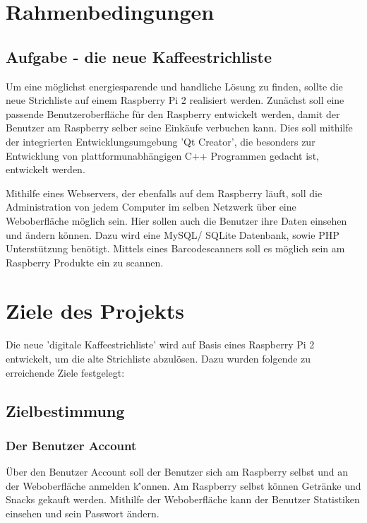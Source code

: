 \documentclass[11pt,a4paper]{article} %
\begin{document}
\section{Rahmenbedingungen}


\subsection{Aufgabe - die neue Kaffeestrichliste}
\label{SchriftAnpassen}

Um eine m\"oglichst energiesparende und handliche L\"osung zu finden, sollte die neue Strichliste auf einem Raspberry Pi 2 realisiert werden. Zun\"achst soll eine passende Benutzeroberfl\"ache f\"ur den Raspberry entwickelt werden, damit der Benutzer am Raspberry selber seine Eink\"aufe verbuchen kann. Dies soll mithilfe der integrierten Entwicklungsumgebung 'Qt Creator', die besonders zur Entwicklung von plattformunabh\"angigen C++ Programmen gedacht ist, entwickelt werden.
\par
Mithilfe eines Webservers, der ebenfalls auf dem Raspberry l\"auft, soll die Administration von jedem Computer im selben Netzwerk \"uber eine Weboberfl\"ache m\"oglich sein. Hier sollen auch die Benutzer ihre Daten einsehen und \"andern k\"onnen. Dazu wird eine MySQL/ SQLite Datenbank, sowie PHP Unterst\"utzung ben\"otigt. Mittels eines Barcodescanners soll es m\"oglich sein am Raspberry Produkte ein zu scannen.


\section{Ziele des Projekts}
Die neue 'digitale Kaffeestrichliste' wird auf Basis eines Raspberry Pi 2 entwickelt, um die alte Strichliste abzul\"osen. Dazu wurden folgende zu erreichende Ziele festgelegt:
\subsection{Zielbestimmung}
\label{Ausrichtung}

\subsubsection{Der Benutzer Account}
\"Uber den Benutzer Account soll der Benutzer sich am Raspberry selbst und an der Weboberfl\"ache anmelden k\''onnen. Am Raspberry selbst k\"onnen Getr\"anke und Snacks gekauft werden. Mithilfe der Weboberfl\"ache kann der Benutzer Statistiken einsehen und sein Passwort \"andern.
\end{document}
